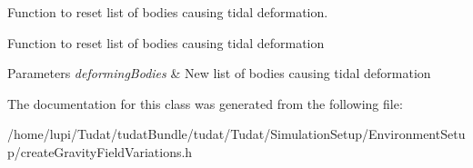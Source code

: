 Function to reset list of bodies causing tidal deformation. 

Function to reset list of bodies causing tidal deformation 
\begin{DoxyParams}{Parameters}
{\em deforming\+Bodies} & New list of bodies causing tidal deformation \\
\hline
\end{DoxyParams}


The documentation for this class was generated from the following file\+:\begin{DoxyCompactItemize}
\item 
/home/lupi/\+Tudat/tudat\+Bundle/tudat/\+Tudat/\+Simulation\+Setup/\+Environment\+Setup/create\+Gravity\+Field\+Variations.\+h\end{DoxyCompactItemize}
